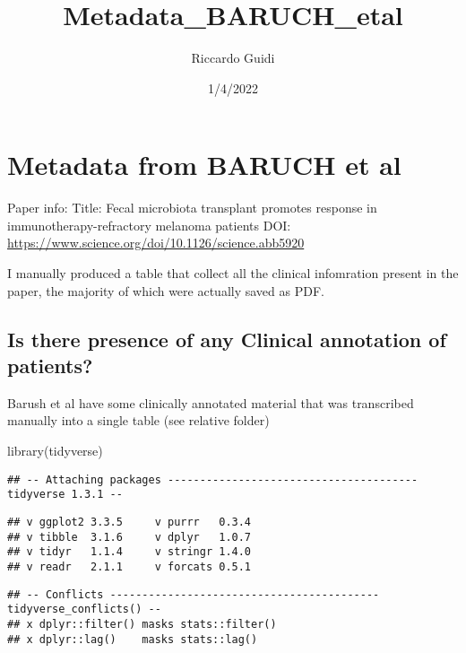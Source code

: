 \documentclass[
]{article}
\title{Metadata\_BARUCH\_etal}
\author{Riccardo Guidi}
\date{1/4/2022}
\newenvironment{Shaded}{\begin{snugshade}}{\end{snugshade}}
\newcommand{\FunctionTok}[1]{\textcolor[rgb]{0.00,0.00,0.00}{#1}}
\newcommand{\NormalTok}[1]{#1}
\begin{document}
\maketitle

\hypertarget{metadata-from-baruch-et-al}{%
\section{Metadata from BARUCH et al}\label{metadata-from-baruch-et-al}}

Paper info: Title: Fecal microbiota transplant promotes response in
immunotherapy-refractory melanoma patients DOI:
\url{https://www.science.org/doi/10.1126/science.abb5920}

I manually produced a table that collect all the clinical infomration
present in the paper, the majority of which were actually saved as PDF.

\hypertarget{is-there-presence-of-any-clinical-annotation-of-patients}{%
\subsection{Is there presence of any Clinical annotation of
patients?}\label{is-there-presence-of-any-clinical-annotation-of-patients}}

Barush et al have some clinically annotated material that was
transcribed manually into a single table (see relative folder)

\begin{Shaded}
\begin{Highlighting}[]
\FunctionTok{library}\NormalTok{(tidyverse)}
\end{Highlighting}
\end{Shaded}

\begin{verbatim}
## -- Attaching packages --------------------------------------- tidyverse 1.3.1 --
\end{verbatim}

\begin{verbatim}
## v ggplot2 3.3.5     v purrr   0.3.4
## v tibble  3.1.6     v dplyr   1.0.7
## v tidyr   1.1.4     v stringr 1.4.0
## v readr   2.1.1     v forcats 0.5.1
\end{verbatim}

\begin{verbatim}
## -- Conflicts ------------------------------------------ tidyverse_conflicts() --
## x dplyr::filter() masks stats::filter()
## x dplyr::lag()    masks stats::lag()
\end{verbatim}
\end{document}
